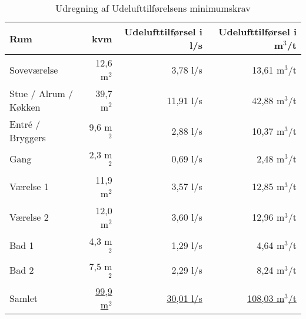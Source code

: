 \begin{table}[!h]
     \begin{center}
        \begin{tabular}{|l|r|r|r|}
            \hline
            Rum & kvm & Udelufttilførsel i l/s & Udelufttilførsel i m$^3$/t \\
            \hline
            Soveværelse       & 12,6 m$^2$ & 3,78 l/s & 13,61 m$^3$/t\\
            Stue / Alrum / Køkken & 39,7 m$^2$ & 11,91 l/s & 42,88 m$^3$/t\\
            Entré / Bryggers  & 9,6 m$^2$ & 2,88 l/s & 10,37 m$^3$/t\\
            Gang              & 2,3 m$^2$ & 0,69 l/s & 2,48 m$^3$/t\\
            Værelse 1         & 11,9 m$^2$ & 3,57 l/s & 12,85 m$^3$/t\\
            Værelse 2         & 12,0 m$^2$ & 3,60 l/s & 12,96 m$^3$/t\\
            Bad 1             & 4,3 m$^2$ & 1,29 l/s & 4,64 m$^3$/t\\
            Bad 2             & 7,5 m$^2$ & 2,29 l/s & 8,24 m$^3$/t\\
            \hline
            \hline
            Samlet & \underline{99,9 m$^2$} & \underline{30,01 l/s} & \underline{108,03 m$^3$/t} \\
            \hline
        \end{tabular}
    \end{center}
    \caption{Udregning af Udelufttilførelsens minimumskrav}
    \label{table:samregn_vent_ind}
\end{table}

